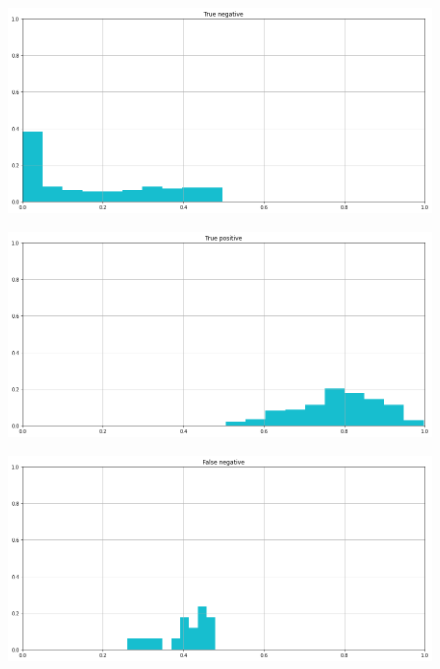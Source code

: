 \documentclass[12pt]{report}
\theoremstyle{definition}
\begin{document}
\begin{figure}
\centering
    \begin{minipage}{0.48\textwidth}
     \includegraphics[width=\linewidth]{images/experiment_beta05_sovrapposti/tn.png}\label{tn_b05s}
   \end{minipage}
   \begin{minipage}{0.48\textwidth}
     \includegraphics[width=\linewidth]{images/experiment_beta05_sovrapposti/tp.png}\label{tp_b05s}
   \end{minipage}
   \begin{minipage}{0.48\textwidth}
     \includegraphics[width=\linewidth]{images/experiment_beta05_sovrapposti/fn.png}\label{fn_b05s}

\end{minipage}
\end{figure}
\end{document}
